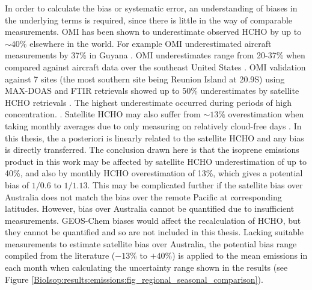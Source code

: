     In order to calculate the bias or systematic error, an understanding of biases in the underlying terms is required, since there is little in the way of comparable measurements.
    OMI has been shown to underestimate observed HCHO by up to $\sim40\%$ elsewhere in the world.
    For example OMI underestimated aircraft measurements by 37\% in Guyana \parencite{Barkley2013}.
    OMI underestimates range from 20-37\% when compared against aircraft data over the southeast United States \parencite{Zhu2016}.
    OMI validation against 7 sites (the most southern site being Reunion Island at 20.9\degr S) using MAX-DOAS and FTIR retrievals showed up to 50\% underestimates by satellite HCHO retrievals \parencite{DeSmedt2015}.
    The highest underestimate occurred during periods of high concentration. 
    \parencite{Vigouroux2009,DeSmedt2015}.
    Satellite HCHO may also suffer from $\sim{13}\%$ overestimation when taking monthly averages due to only measuring on relatively cloud-free days \parencite{Surl2018}.
    In this thesis, the a posteriori is linearly related to the satellite HCHO and any bias is directly transferred.
    The conclusion drawn here is that the isoprene emissions product in this work may be affected by satellite HCHO underestimation of up to 40\%, and also by monthly HCHO overestimation of 13\%, which gives a potential bias of $1/0.6$ to $1/1.13$.
    This may be complicated further if the satellite bias over Australia does not match the bias over the remote Pacific at corresponding latitudes.
    However, bias over Australia cannot be quantified due to insufficient measurements.
    GEOS-Chem biases would affect the recalculation of HCHO, but they cannot be quantified and so are not included in this thesis.
    Lacking suitable measurements to estimate satellite bias over Australia, the potential bias range compiled from the literature ($-13\%$ to $+40\%$) is applied to the mean emissions in each month when calculating the uncertainty range shown in the results (see Figure \ref{BioIsop:results:emissions:fig_regional_seasonal_comparison}).
    
      
      
